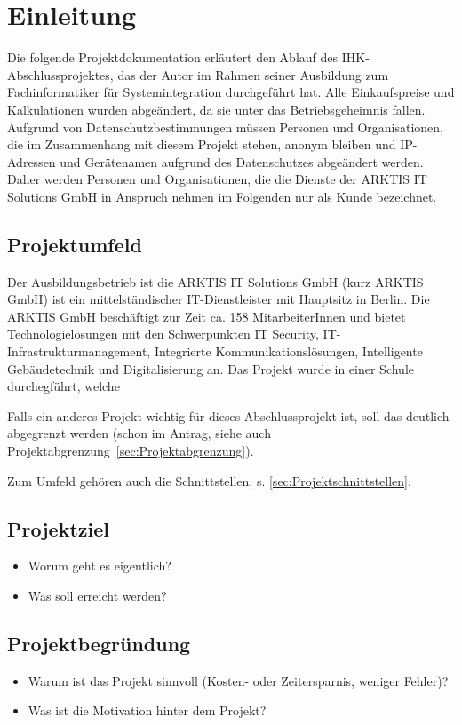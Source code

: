 \newpage
\section{Einleitung}
\label{sec:Einleitung}
Die folgende Projektdokumentation erläutert den Ablauf des IHK-Abschlussprojektes, das der Autor im Rahmen seiner Ausbildung zum Fachinformatiker für Systemintegration durchgeführt hat. Alle Einkaufspreise und Kalkulationen wurden abgeändert, da sie unter das Betriebsgeheimnis fallen. Aufgrund von Datenschutzbestimmungen müssen Personen und Organisationen, die im Zusammenhang mit diesem Projekt stehen, anonym bleiben und IP-Adressen und Gerätenamen aufgrund des Datenschutzes abgeändert werden. Daher werden Personen und Organisationen, die die Dienste der ARKTIS IT Solutions GmbH in Anspruch nehmen im Folgenden nur als Kunde bezeichnet. 

\subsection{Projektumfeld} 
\label{sec:Projektumfeld}
Der Ausbildungsbetrieb ist die ARKTIS IT Solutions GmbH (kurz ARKTIS GmbH) ist ein mittelständischer IT-Dienstleister mit Hauptsitz in Berlin. Die ARKTIS GmbH beschäftigt zur Zeit ca. 158 MitarbeiterInnen und bietet Technologielösungen mit den Schwerpunkten IT Security, IT-Infrastrukturmanagement, Integrierte Kommunikationslösungen, Intelligente Gebäudetechnik und Digitalisierung an. Das Projekt wurde in einer Schule durchegführt, welche       

Falls ein anderes Projekt wichtig für dieses Abschlussprojekt ist, soll das deutlich abgegrenzt werden (\bzw schon im Antrag, siehe auch Projektabgrenzung~\ref{sec:Projektabgrenzung}).

Zum Umfeld gehören auch die Schnittstellen, s. \ref{sec:Projektschnittstellen}.

\subsection{Projektziel} 
\label{sec:Projektziel}
\begin{itemize}
	\item Worum geht es eigentlich?
	\item Was soll erreicht werden?
\end{itemize}


\subsection{Projektbegründung} 
\label{sec:Projektbegruendung}
\begin{itemize}
	\item Warum ist das Projekt sinnvoll (\zB Kosten- oder Zeitersparnis, weniger Fehler)?
	\item Was ist die Motivation hinter dem Projekt?
\end{itemize}


